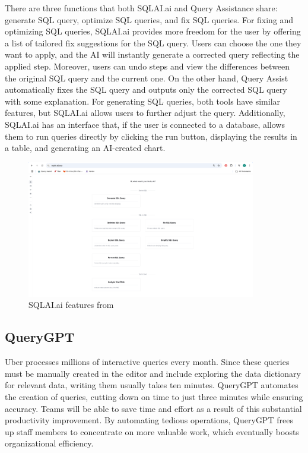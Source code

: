     There are three functions that both SQLAI.ai and Query Assistance share: generate SQL query, optimize SQL queries, and fix SQL queries. For fixing and optimizing SQL queries, SQLAI.ai provides more freedom for the user by offering a list of tailored fix suggestions for the SQL query. Users can choose the one they want to apply, and the AI will instantly generate a corrected query reflecting the applied step. Moreover, users can undo steps and view the differences between the original SQL query and the current one. On the other hand, Query Assist automatically fixes the SQL query and outputs only the corrected SQL query with some explanation. For generating SQL queries, both tools have similar features, but SQLAI.ai allows users to further adjust the query. Additionally, SQLAI.ai has an interface that, if the user is connected to a database, allows them to run queries directly by clicking the run button, displaying the results in a table, and generating an AI-created chart.
    \cite{SQLAI}
    \begin{figure}[H]
        \centering
        \includegraphics[width=10cm]{chapters/2/figures/sqlai.png}
        \caption[SQLAI.ai features]{SQLAI.ai features  from~\cite{SQLAI}}
        \label{fig:sqlai}
    \end{figure}

    \subsection{QueryGPT}
    Uber processes millions of interactive queries every month. Since these queries must be manually created in the editor and include exploring the data dictionary for relevant data, writing them usually takes ten minutes. QueryGPT automates the creation of queries, cutting down on time to just three minutes while ensuring accuracy. Teams will be able to save time and effort as a result of this substantial productivity improvement. By automating tedious operations, QueryGPT frees up staff members to concentrate on more valuable work, which eventually boosts organizational efficiency.

